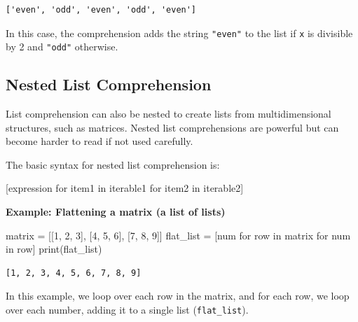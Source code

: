 \documentclass[
  letterpaper,
  DIV=11,
  numbers=noendperiod]{scrreprt}
\newenvironment{Shaded}{\begin{snugshade}}{\end{snugshade}}
\newcommand{\BuiltInTok}[1]{\textcolor[rgb]{0.00,0.23,0.31}{#1}}
\newcommand{\ControlFlowTok}[1]{\textcolor[rgb]{0.00,0.23,0.31}{#1}}
\newcommand{\DecValTok}[1]{\textcolor[rgb]{0.68,0.00,0.00}{#1}}
\newcommand{\KeywordTok}[1]{\textcolor[rgb]{0.00,0.23,0.31}{#1}}
\newcommand{\NormalTok}[1]{\textcolor[rgb]{0.00,0.23,0.31}{#1}}
\newcommand{\OperatorTok}[1]{\textcolor[rgb]{0.37,0.37,0.37}{#1}}
\begin{document}
\begin{verbatim}
['even', 'odd', 'even', 'odd', 'even']
\end{verbatim}

In this case, the comprehension adds the string \texttt{"even"} to the
list if \texttt{x} is divisible by 2 and \texttt{"odd"} otherwise.

\hypertarget{nested-list-comprehension}{%
\subsection{Nested List Comprehension}\label{nested-list-comprehension}}

List comprehension can also be nested to create lists from
multidimensional structures, such as matrices. Nested list
comprehensions are powerful but can become harder to read if not used
carefully.

The basic syntax for nested list comprehension is:

\begin{Shaded}
\begin{Highlighting}[]
\NormalTok{[expression }\ControlFlowTok{for}\NormalTok{ item1 }\KeywordTok{in}\NormalTok{ iterable1 }\ControlFlowTok{for}\NormalTok{ item2 }\KeywordTok{in}\NormalTok{ iterable2]}
\end{Highlighting}
\end{Shaded}

\textbf{Example: Flattening a matrix (a list of lists)}

\begin{Shaded}
\begin{Highlighting}[]
\NormalTok{matrix }\OperatorTok{=}\NormalTok{ [[}\DecValTok{1}\NormalTok{, }\DecValTok{2}\NormalTok{, }\DecValTok{3}\NormalTok{], [}\DecValTok{4}\NormalTok{, }\DecValTok{5}\NormalTok{, }\DecValTok{6}\NormalTok{], [}\DecValTok{7}\NormalTok{, }\DecValTok{8}\NormalTok{, }\DecValTok{9}\NormalTok{]]}
\NormalTok{flat\_list }\OperatorTok{=}\NormalTok{ [num }\ControlFlowTok{for}\NormalTok{ row }\KeywordTok{in}\NormalTok{ matrix }\ControlFlowTok{for}\NormalTok{ num }\KeywordTok{in}\NormalTok{ row]}
\BuiltInTok{print}\NormalTok{(flat\_list) }
\end{Highlighting}
\end{Shaded}

\begin{verbatim}
[1, 2, 3, 4, 5, 6, 7, 8, 9]
\end{verbatim}

In this example, we loop over each row in the matrix, and for each row,
we loop over each number, adding it to a single list
(\texttt{flat\_list}).
\end{document}
